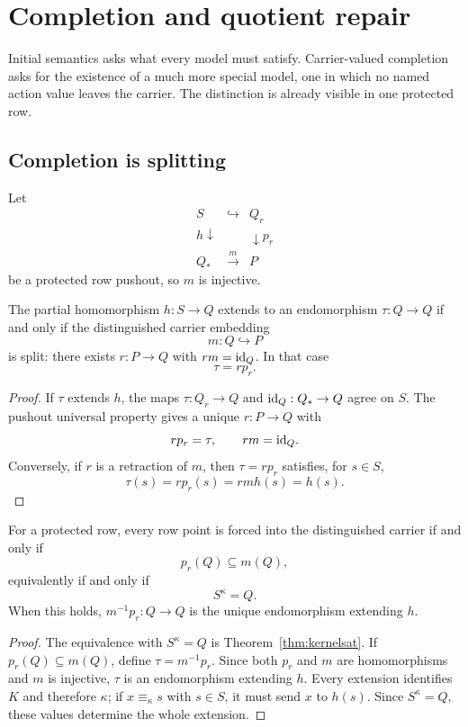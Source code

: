 \section{Completion and quotient repair}\label{sec:repair}

Initial semantics asks what every model must satisfy.  Carrier-valued completion asks for the existence of a much more special model, one in which no named action value leaves the carrier.  The distinction is already visible in one protected row.

\subsection{Completion is splitting}

Let
\[
\begin{array}{ccc}
S & \hookrightarrow & Q_r\\
{\scriptstyle h}\downarrow && \downarrow{\scriptstyle p_r}\\
Q_* & \xrightarrow{m} & P
\end{array}
\]
be a protected row pushout, so $m$ is injective.

\begin{theorem}\label{thm:splitting}
The partial homomorphism $h:S\to Q$ extends to an endomorphism $\tau:Q\to Q$ if and only if the distinguished carrier embedding
\[
m:Q\hookrightarrow P
\]
is split: there exists $r:P\to Q$ with $rm=\mathrm{id}_Q$.  In that case
\[
\tau=rp_r.
\]
\end{theorem}

\begin{proof}
If $\tau$ extends $h$, the maps $\tau:Q_r\to Q$ and $\mathrm{id}_Q:Q_*\to Q$ agree on $S$.  The pushout universal property gives a unique $r:P\to Q$ with
\[
rp_r=\tau,
\qquad
rm=\mathrm{id}_Q.
\]
Conversely, if $r$ is a retraction of $m$, then $\tau=rp_r$ satisfies, for $s\in S$,
\[
\tau(s)=rp_r(s)=rmh(s)=h(s).
\]
\end{proof}

\begin{theorem}\label{thm:closurecontainment}
For a protected row, every row point is forced into the distinguished carrier if and only if
\[
p_r(Q)\subseteq m(Q),
\]
equivalently if and only if
\[
S^{\kappa}=Q.
\]
When this holds, $m^{-1}p_r:Q\to Q$ is the unique endomorphism extending $h$.
\end{theorem}

\begin{proof}
The equivalence with $S^\kappa=Q$ is Theorem~\ref{thm:kernelsat}.  If $p_r(Q)\subseteq m(Q)$, define $\tau=m^{-1}p_r$.  Since both $p_r$ and $m$ are homomorphisms and $m$ is injective,
$\tau$ is an endomorphism extending $h$. Every extension identifies $K$ and
therefore $\kappa$; if $x\equiv_\kappa s$ with $s\in S$, it must send $x$
to $h(s)$. Since $S^\kappa=Q$, these values determine the whole extension.
\end{proof}

